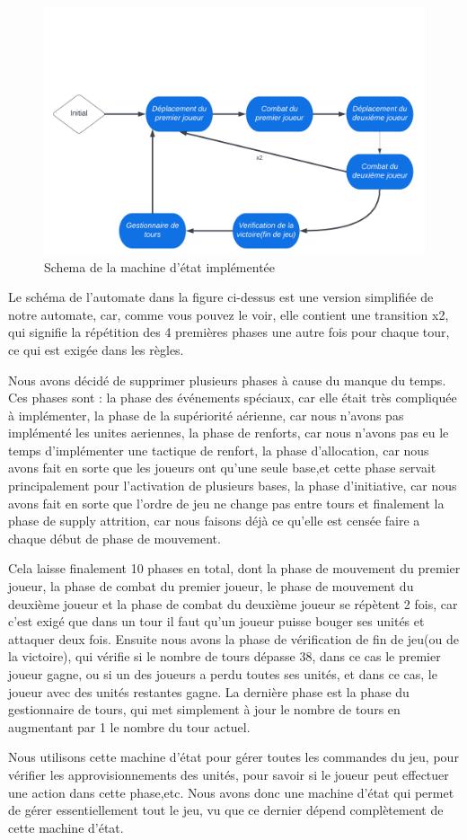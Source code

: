 \begin{figure}[H]
    \centering
    \includegraphics[scale=0.2]{data/State_Machine.png}
    \caption{Schema de la machine d'état implémentée}
    \label{fig:schema_state_machine}
\end{figure}

Le schéma de l'automate dans la figure ci-dessus est une version simplifiée de notre automate, car, comme vous pouvez le voir, elle contient une transition x2, qui signifie la répétition des 4 premières phases une autre fois pour chaque tour, ce qui est exigée dans les règles.

Nous avons décidé de supprimer plusieurs phases à cause du manque du temps. Ces phases sont : la phase des événements spéciaux, car elle était très compliquée à implémenter, la phase de la supériorité aérienne, car nous n'avons pas implémenté les unites aeriennes, la phase de renforts, car nous n'avons pas eu le temps d'implémenter une tactique de renfort, la phase d'allocation, car nous avons fait en sorte que les joueurs ont qu'une seule base,et cette phase servait principalement pour l'activation de plusieurs bases, la phase d'initiative, car nous avons fait en sorte que l'ordre de jeu ne change pas entre tours et finalement la phase de supply attrition, car nous faisons déjà ce qu'elle est censée faire a chaque début de phase de mouvement.

Cela laisse finalement 10 phases en total, dont la phase de mouvement du premier joueur, la phase de combat du premier joueur, le phase de mouvement du deuxième joueur et la phase de combat du deuxième joueur se répètent 2 fois, car c'est exigé que dans un tour il faut qu'un joueur puisse bouger ses unités et attaquer deux fois. Ensuite nous avons la phase de vérification de fin de jeu(ou de la victoire), qui vérifie si le nombre de tours dépasse 38, dans ce cas le premier joueur gagne, ou si un des joueurs a perdu toutes ses unités, et dans ce cas, le joueur avec des unités restantes gagne. La dernière phase est la phase du gestionnaire de tours, qui met simplement à jour le nombre de tours en augmentant par 1 le nombre du tour actuel.

Nous utilisons cette machine d'état pour gérer toutes les commandes du jeu, pour vérifier les approvisionnements des unités, pour savoir si le joueur peut effectuer une action dans cette phase,etc. Nous avons donc une machine d'état qui permet de gérer essentiellement tout le jeu, vu que ce dernier dépend complètement de cette machine d'état.